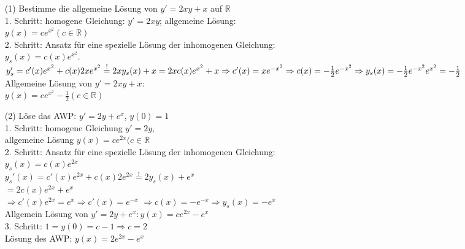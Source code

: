 \documentclass{article}
\begin{document}
\begin{beispiel}
\begin{itemize}
	\item [(1)] Bestimme die allgemeine Lösung von $y'=2xy + x$ auf $\mathbb{R}$ \\
	1. Schritt: homogene Gleichung: $y'= 2xy$; allgemeine Lösung: \\
	$y(x) = c e ^{x^2} (c \in \mathbb{R})$ \\
	2. Schritt: Ansatz für eine spezielle Lösung der inhomogenen Gleichung: \\
	$y_s(x) = c(x) e^{x^2}$. \\
	$y_s' = c'(x) e^{x^2} + c(x) 2 x e ^{x^2} \stackrel{!}{=}2xy_s(x)+x
	= 2x c(x) e^{x^2} + x \\
	\Rightarrow c'(x) = xe^{-x^2} \Rightarrow c(x) = - \frac{1}{2} e^{-x^2} \\
	\Rightarrow y_s(x) = - \frac{1}{2} e^{-x^2} e^{x^2} = - \frac{1}{2}$ \\
	Allgemeine Lösung von $y' = 2xy + x$: \\
	$y(x) = ce ^{x^2} - \frac{1}{2} (c \in \mathbb{R})$
	\item[(2)] Löse das AWP: $y' = 2y + e^x$, $y(0) = 1$ \\
	1. Schritt: homogene Gleichung $y' = 2y$, \\
	allgemeine Lösung $y(x) = c e^{2x} (c\in \mathbb{R}$ \\
	2. Schritt: Ansatz für eine spezielle Lösung der inhomogenen Gleichung: \\
	$y_s(x) = c(x) e^{2x}$ \\
	$y_s'(x) = c'(x) e^{2x} + c(x) 2e^{2x} \stackrel{!}{=} 2y_s(x) + e^x$ \\
	$= 2c(x)e^{2x}+e^x$ \\
	$\Rightarrow c'(x) e^{2x} = e^x \Rightarrow c'(x) = e^{-x}$ 
	$\Rightarrow c(x) = -e^{-x} \Rightarrow y_s(x) = -e^{x}$ \\
	Allgemein Lösung von $y'=2y + e^x: y(x) = ce^{2x} - e^x$ \\
	3. Schritt: $1 = y(0) = c - 1 \Rightarrow c = 2$ \\
	Lösung des AWP: $y(x) = 2e^{2x} - e^x$
\end{itemize}
\end{beispiel}
\end{document}
